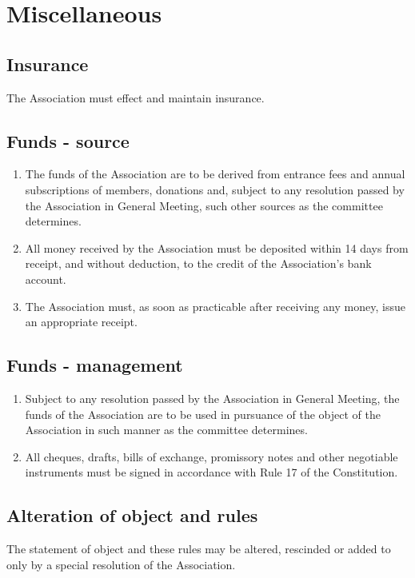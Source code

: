 \section{Miscellaneous}

\subsection{Insurance}
The Association must effect and maintain insurance.

\subsection{Funds - source}
\begin{enumerate}
  \item The funds of the Association are to be derived from entrance fees and annual subscriptions of members, donations and, subject to any resolution passed by the Association in General Meeting, such other sources as the committee determines.
  \item All money received by the Association must be deposited within 14 days from receipt, and without deduction, to the credit of the Association’s bank account.
  \item The Association must, as soon as practicable after receiving any money, issue an appropriate receipt.
\end{enumerate}

\subsection{Funds - management}
\begin{enumerate}
  \item Subject to any resolution passed by the Association in General Meeting, the funds of the Association are to be used in pursuance of the object of the Association in such manner as the committee determines.
  \item All cheques, drafts, bills of exchange, promissory notes and other negotiable instruments must be signed in accordance with Rule 17 of the Constitution.
\end{enumerate}

\subsection{Alteration of object and rules}
The statement of object and these rules may be altered, rescinded or added to only by a special resolution of the Association.

